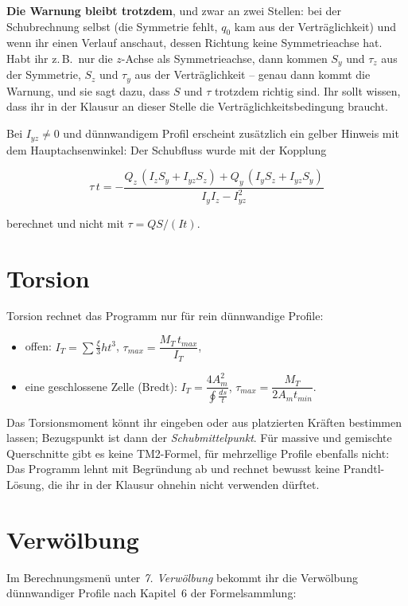 \textbf{Die Warnung bleibt trotzdem}, und zwar an zwei Stellen: bei der Schubrechnung selbst
(die Symmetrie fehlt, $q_0$ kam aus der Verträglichkeit) und wenn ihr einen Verlauf anschaut,
dessen Richtung keine Symmetrieachse hat. Habt ihr z.\,B.\ nur die $z$-Achse als Symmetrieachse,
dann kommen $S_y$ und $\tau_z$ aus der Symmetrie, $S_z$ und $\tau_y$ aus der Verträglichkeit --
genau dann kommt die Warnung, und sie sagt dazu, dass $S$ und $\tau$ trotzdem richtig sind. Ihr
sollt wissen, dass ihr in der Klausur an dieser Stelle die Verträglichkeitsbedingung braucht.

Bei $I_{yz} \ne 0$ und dünnwandigem Profil erscheint zusätzlich ein gelber Hinweis mit dem
Hauptachsenwinkel: Der Schubfluss wurde mit der Kopplung

\[
  \tau\,t = -\frac{Q_z\,(I_z S_y + I_{yz} S_z) + Q_y\,(I_y S_z + I_{yz} S_y)}{I_y I_z - I_{yz}^2}
\]

berechnet und nicht mit $\tau = QS/(It)$.


\section{Torsion}

Torsion rechnet das Programm nur für rein dünnwandige Profile:

\begin{itemize}
  \item offen: $I_T = \sum \frac{\xi}{3} h t^3$, \quad $\tau_{max} = \dfrac{M_T\,t_{max}}{I_T}$,
  \item eine geschlossene Zelle (Bredt): $I_T = \dfrac{4A_m^2}{\oint \frac{ds}{t}}$,
        \quad $\tau_{max} = \dfrac{M_T}{2 A_m t_{min}}$.
\end{itemize}

Das Torsionsmoment könnt ihr eingeben oder aus platzierten Kräften bestimmen lassen; Bezugspunkt
ist dann der \emph{Schubmittelpunkt}. Für massive und gemischte Querschnitte gibt es keine
TM2-Formel, für mehrzellige Profile ebenfalls nicht: Das Programm lehnt mit Begründung ab und
rechnet bewusst keine Prandtl-Lösung, die ihr in der Klausur ohnehin nicht verwenden dürftet.

\section{Verwölbung}

Im Berechnungsmenü unter \emph{7. Verwölbung} bekommt ihr die Verwölbung dünnwandiger Profile
nach Kapitel~6 der Formelsammlung:

